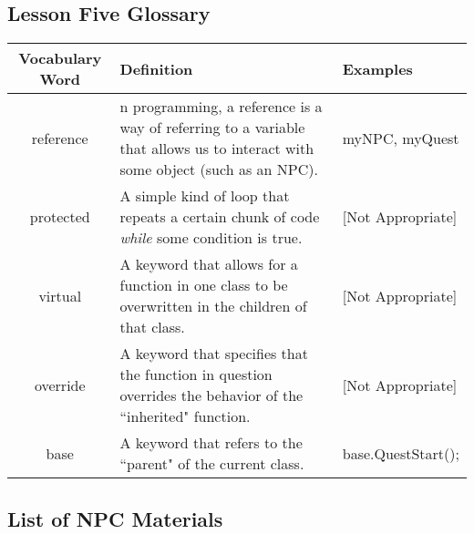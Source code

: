 \documentclass{article}
\begin{document}
\subsection{Lesson Five Glossary}
\begin{center}
\begin{tabular}{ | c | m{5cm}  | m{5cm} | } 
 \hline
 Vocabulary Word & Definition & Examples \\ 
  \hline
  reference & n programming, a reference is a way of referring to a variable that allows us to interact with some object (such as an NPC). & myNPC, myQuest \\ 
  \hline
 protected & A simple kind of loop that repeats a certain chunk of code \textit{while} some condition is true. & [Not Appropriate] \\ 
 \hline
 virtual & A keyword that allows for a function in one class to be overwritten in the children of that class. & [Not Appropriate] \\ 
  \hline
  override & A keyword that specifies that the function in question overrides the behavior of the ``inherited" function. & [Not Appropriate] \\ 
  \hline
 base & A keyword that refers to the ``parent" of the current class. &  base.QuestStart(); \\ 
  \hline
\end{tabular}
\end{center}

\subsection{List of NPC Materials}
\end{document}
